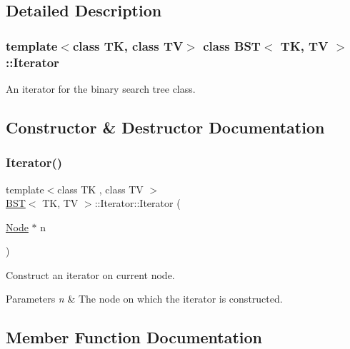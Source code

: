 \subsection{Detailed Description}
\subsubsection*{template$<$class TK, class TV$>$\newline
class B\+S\+T$<$ T\+K, T\+V $>$\+::\+Iterator}

An iterator for the binary search tree class. 

\subsection{Constructor \& Destructor Documentation}
\mbox{\label{classBST_1_1Iterator_a469ca54ca68ad46e381e5d86d06a1c37}} 
\subsubsection{\texorpdfstring{Iterator()}{Iterator()}}
{\footnotesize\ttfamily template$<$class TK , class TV $>$ \\
\hyperlink{classBST}{B\+ST}$<$ TK, TV $>$\+::Iterator\+::\+Iterator (\begin{DoxyParamCaption}\item[{\hyperlink{structBST_1_1Node}{Node} $\ast$}]{n }\end{DoxyParamCaption})\hspace{0.3cm}{\ttfamily [inline]}}



Construct an iterator on current node. 


\begin{DoxyParams}{Parameters}
{\em n} & The node on which the iterator is constructed. \\
\hline
\end{DoxyParams}


\subsection{Member Function Documentation}
\mbox{\label{classBST_1_1Iterator_aaa18a2696f5a0b7d48cc2e7a9c2ce2c1}} 
